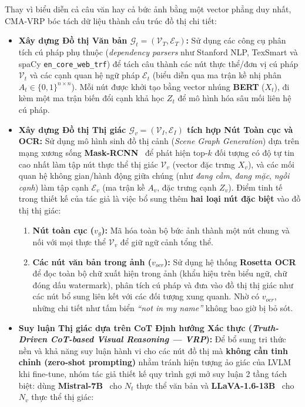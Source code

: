 \documentclass[conference,10pt]{IEEEtran}
\begin{document}
Thay vì biểu diễn cả câu văn hay cả bức ảnh bằng một vector phẳng duy nhất, CMA-VRP bóc tách dữ liệu thành cấu trúc đồ thị chi tiết:
\begin{itemize}
    \item \textbf{Xây dựng Đồ thị Văn bản $\mathcal{G}_t = (\mathcal{V}_T, \mathcal{E}_T)$:} Sử dụng các công cụ phân tích cú pháp phụ thuộc (\textit{dependency parsers} như Stanford NLP, TexSmart và spaCy \texttt{en\_core\_web\_trf}) để tách câu thành các nút thực thể/đơn vị cú pháp $\mathcal{V}_t$ và các cạnh quan hệ ngữ pháp $\mathcal{E}_t$ (biểu diễn qua ma trận kề nhị phân $A_t \in \{0,1\}^{n \times n}$). Mỗi nút được khởi tạo bằng vector nhúng \textbf{BERT} ($X_t$), đi kèm một ma trận biến đổi cạnh khả học $Z_t$ để mô hình hóa sâu mối liên hệ cú pháp.
    \item \textbf{Xây dựng Đồ thị Thị giác $\mathcal{G}_v = (\mathcal{V}_I, \mathcal{E}_I)$ tích hợp Nút Toàn cục và OCR:} Sử dụng mô hình sinh đồ thị cảnh (\textit{Scene Graph Generation}) dựa trên mạng xương sống \textbf{Mask-RCNN}~\cite{he2017maskrcnn} để phát hiện top-$k$ đối tượng có độ tự tin cao nhất làm tập nút thực thể thị giác $\mathcal{V}_v$ (vector đặc trưng $X_v$), và các mối quan hệ không gian/hành động giữa chúng (như \textit{đang cầm}, \textit{đang mặc}, \textit{ngồi cạnh}) làm tập cạnh $\mathcal{E}_v$ (ma trận kề $A_v$, đặc trưng cạnh $Z_v$). Điểm tinh tế trong thiết kế của tác giả là việc bổ sung thêm \textbf{hai loại nút đặc biệt} vào đồ thị thị giác:
    \begin{enumerate}
        \item \textbf{Nút toàn cục ($v_g$):} Mã hóa toàn bộ bức ảnh thành một nút chung và nối với mọi thực thể $\mathcal{V}_v$ để giữ ngữ cảnh tổng thể.
        \item \textbf{Các nút văn bản trong ảnh ($v_{ocr}$):} Sử dụng hệ thống \textbf{Rosetta OCR}~\cite{borisyuk2018rosetta} để đọc toàn bộ chữ xuất hiện trong ảnh (khẩu hiệu trên biểu ngữ, chữ đóng dấu watermark), phân tích cú pháp và đưa vào đồ thị thị giác như các nút bổ sung liên kết với các đối tượng xung quanh. Nhờ có $v_{ocr}$, những chi tiết như tấm biển \textit{``not in my name''} không bao giờ bị bỏ sót.
    \end{enumerate}
    \item \textbf{Suy luận Thị giác dựa trên CoT Định hướng Xác thực (\textit{Truth-Driven CoT-based Visual Reasoning --- VRP}):}
    Để bổ sung tri thức nền và khả năng suy luận hành vi cho các nút đồ thị mà \textbf{không cần tinh chỉnh (zero-shot prompting)} nhằm tránh hiện tượng ảo giác của LVLM khi fine-tune, nhóm tác giả thiết kế quy trình gợi mở suy luận 2 tầng tách biệt: dùng \textbf{Mistral-7B}~\cite{jiang2023mistral} cho $N_t$ thực thể văn bản và \textbf{LLaVA-1.6-13B}~\cite{liu2023llava} cho $N_v$ thực thể thị giác:

\end{itemize}
\end{document}
